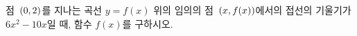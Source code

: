 점~$(0{,}\mkern3mu\mathopen{}2)$를 지나는 곡선 $y=f(x)$ 위의 임의의 점~$(x{,}\mkern3mu\mathopen{}f(x))$에서의 접선의 기울기가 $6x^2-10x$일 때, 함수 $f(x)$를 구하시오.
